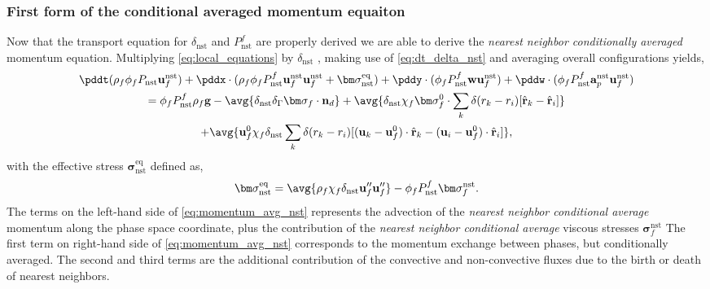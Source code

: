 \subsubsection{First form of the conditional averaged momentum equaiton}
Now that the transport equation for $\delta_\text{nst}$ and $P_\text{nst}^f$ are properly derived we are able to derive the \textit{nearest neighbor conditionally averaged} momentum equation. 
Multiplying \ref{eq:local_equations} by $\delta_\text{nst}$ , making use of \ref{eq:dt_delta_nst} and averaging overall configurations yields, 
\begin{multline}
    \pddt (\rho_f\phi_f P_\text{nst} \textbf{u}^\text{nst}_f)
    + \pddx\cdot (
        \rho_f\phi_fP_\text{nst}^f \textbf{u}^\text{nst}_f\textbf{u}^\text{nst}_f 
        +\bm\sigma_\text{nst}^\text{eq})
    + \pddy\cdot (\phi_fP_\text{nst}^f \textbf{w}\textbf{u}_f^\text{nst} )
    + \pddw\cdot (\phi_fP_\text{nst}^f \textbf{a}_p^\text{nst} \textbf{u}_f^\text{nst} )\\
    = 
    \phi_fP_\text{nst}^f  \rho_f \textbf{g}
    - \avg{\delta_\text{nst}\delta_\Gamma \bm\sigma_f \cdot \textbf{n}_d} 
    +\avg{
        \delta_\text{nst}
        \chi_f \bm\sigma_f^0 \cdot
        \sum_k 
        \delta(r_k - r_i)
        [\hat{\textbf{r}}_k - \hat{\textbf{r}}_i]}\\
    +\avg{
         \textbf{u}_f^0\chi_f \delta_\text{nst}
        \sum_k 
        \delta(r_k - r_i)
        [(\textbf{u}_k - \textbf{u}_f^0) \cdot \hat{\textbf{r}}_k - (\textbf{u}_i- \textbf{u}_f^0)  \cdot \hat{\textbf{r}}_i]},
    \label{eq:momentum_avg_nst}
\end{multline}
with the effective stress $\bm\sigma_\text{nst}^\text{eq}$ defined as, 
\begin{equation}
    \bm\sigma_\text{nst}^\text{eq}=
    \avg{\rho_f\chi_f\delta_\text{nst} \textbf{u}''_f\textbf{u}''_f} 
    - \phi_f P_\text{nst}^f \bm\sigma^\text{nst}_f. 
\end{equation}
The terms on the left-hand side of \ref{eq:momentum_avg_nst} represents the advection of the \textit{nearest neighbor conditional average} momentum along the phase space coordinate, plus the contribution of the \textit{nearest neighbor conditional average} viscous stresses $\bm\sigma^\text{nst}_f$
The first term on right-hand side of \ref{eq:momentum_avg_nst} corresponds to the momentum exchange between phases, but conditionally averaged. 
The second and third terms are the additional contribution of the convective and non-convective fluxes due to the birth or death of nearest neighbors. 


